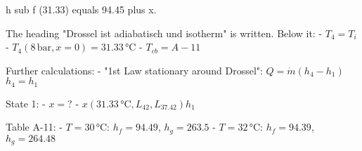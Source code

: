 h sub f (31.33) equals 94.45 plus x.

The heading "Drossel ist adiabatisch und isotherm" is written. Below it:  
- \( T_4 = T_i \)  
- \( T_4 (8 \, \text{bar}, x = 0) = 31.33 \, \text{°C} \)  
- \( T_{cb} = A-11 \)  

Further calculations:  
- "1st Law stationary around Drossel":  
  \( Q = \dot{m} (h_4 - h_1) \)  
  \( h_4 = h_1 \)  

State 1:  
- \( x = ? \)  
- \( x (31.33 \, \text{°C}, L_{42}, L_{37.42}) h_1 \)  

Table A-11:  
- \( T = 30 \, \text{°C} \): \( h_f = 94.49 \), \( h_g = 263.5 \)  
- \( T = 32 \, \text{°C} \): \( h_f = 94.39 \), \( h_g = 264.48 \)